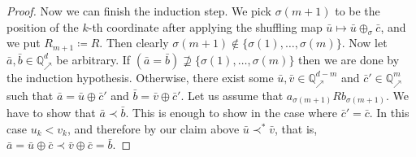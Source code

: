 \documentclass[10pt,a4paper]{amsart}
\newcommand\qup[1]{\mathbb{Q}_\nearrow^{#1}}
\newcommand{\shuff}{\oplus}
\begin{document}
\begin{proof}
	Now we can finish the induction step. We pick $\sigma({m+1})$ to be the position of the $k$-th coordinate after applying the shuffling map $\bar{u}\mapsto \bar{u}\shuff_{\sigma}\bar{c}$, and we put $R_{m+1}\coloneqq R$. Then clearly $\sigma(m+1) \not\in \{\sigma(1),\dots,\sigma(m)\}$. Now let $\bar{a},\bar{b}\in \qup{d}$ be arbitrary. If $(\bar{a}=\bar{b})\not\supseteq \{\sigma(1),\dots,\sigma(m)\}$ then we are done by the induction hypothesis. Otherwise, there exist some $\bar{u},\bar{v}\in \qup{d-m}$ and $\bar{c}'\in \qup{m}$ such that $\bar{a}=\bar{u}\shuff \bar{c}'$ and $\bar{b}=\bar{v}\shuff \bar{c}'$. Let us assume that $a_{\sigma(m+1)}Rb_{\sigma(m+1)}$. We have to show that $\bar{a}\prec \bar{b}$. This is enough to show in the case where  $\bar{c}'=\bar{c}$. In this case $u_k<v_k$, and therefore by our claim above $\bar{u}\prec^*\bar{v}$, that is, $\bar{a}=\bar{u}\shuff \bar{c}\prec \bar{v}\shuff \bar{c}=\bar{b}$.
\end{proof}
\end{document}
